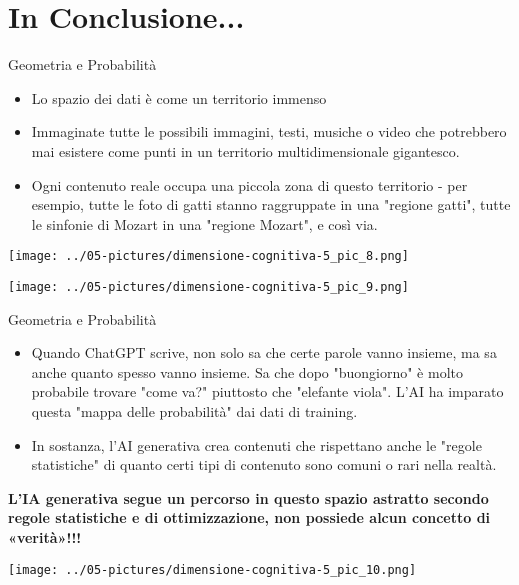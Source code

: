 \documentclass[aspectratio=169]{beamer}
\begin{document}
\section{In Conclusione...}
%
%
\begin{frame}{Geometria e Probabilità}
\begin{itemize}
\item Lo spazio dei dati è come un territorio immenso
\item Immaginate tutte le possibili immagini, testi, musiche o video che potrebbero mai esistere come punti in un territorio multidimensionale gigantesco. 
\item Ogni contenuto reale occupa una piccola zona di questo territorio - per esempio, tutte le foto di gatti stanno raggruppate in una "regione gatti", tutte le sinfonie di Mozart in una "regione Mozart", e così via.
\end{itemize}
\end{frame}
%
%
\begin{frame}
\begin{center}
\texttt{[image: ../05-pictures/dimensione-cognitiva-5\_pic\_8.png]} 
\end{center}
\end{frame}
%
%
\begin{frame}
\begin{center}
\texttt{[image: ../05-pictures/dimensione-cognitiva-5\_pic\_9.png]} 
\end{center}
\end{frame}
%
%
\begin{frame}{Geometria e Probabilità}
\begin{itemize}
\item Quando ChatGPT scrive, non solo sa che certe parole vanno insieme, ma sa anche quanto spesso vanno insieme. Sa che dopo "buongiorno" è molto probabile trovare "come va?" piuttosto che "elefante viola". L'AI ha imparato questa "mappa delle probabilità" dai dati di training.
\item In sostanza, l'AI generativa crea contenuti che rispettano anche le "regole statistiche" di quanto certi tipi di contenuto sono comuni o rari nella realtà.
\end{itemize}
\vspace{0.5cm}
\textbf{L’IA generativa segue un percorso in questo spazio astratto secondo regole statistiche e di ottimizzazione, non possiede alcun concetto di «verità»!!!}
\end{frame}
%
%
\begin{frame}
\begin{center}
\texttt{[image: ../05-pictures/dimensione-cognitiva-5\_pic\_10.png]} 
\end{center}
\end{frame}
%
%
\end{document}
